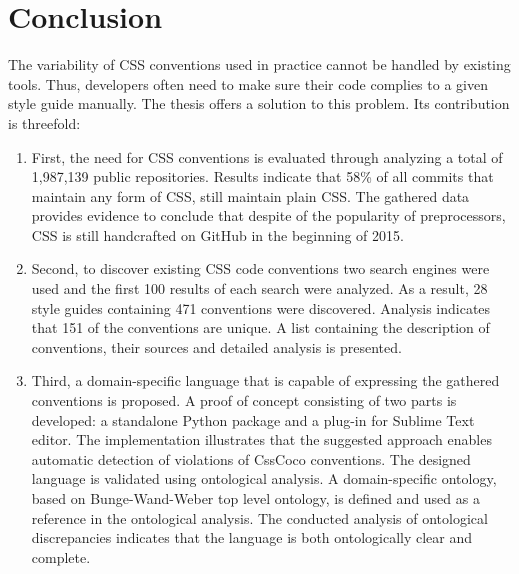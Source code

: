\chapter{Conclusion}
\label{sec:conclusion}

The variability of CSS conventions used in practice cannot be handled by
existing tools. Thus, developers often need to make sure their code complies
to a given style guide manually. The thesis offers a solution to this problem.
Its contribution is threefold:

\begin{enumerate}
	\item First, the need for CSS conventions is evaluated through analyzing a total of 1,987,139 public repositories. Results indicate that 58\% of all commits that maintain any form of CSS, still maintain plain CSS. The gathered data provides evidence to conclude that despite of the popularity of preprocessors, CSS is still handcrafted on GitHub in the beginning of 2015.
	\item Second, to discover existing CSS code conventions two search engines were used and the first 100 results of each search were analyzed. As a result, 28 style guides containing 471 conventions were discovered. Analysis indicates that 151 of the conventions are unique. A list containing the description of conventions, their sources and detailed analysis is presented. 
	\item Third, a domain-specific language that is capable of expressing the gathered conventions is proposed. A proof of concept consisting of two parts is developed: a standalone Python package and a plug-in for Sublime Text editor. The implementation illustrates that the suggested approach enables
	automatic detection of violations of CssCoco conventions. The designed language is validated using ontological analysis. A domain-specific ontology, based on Bunge-Wand-Weber top level ontology, is defined and used as a reference in the ontological analysis. The conducted analysis of ontological discrepancies indicates that the language is both ontologically clear and complete.
\end{enumerate}

